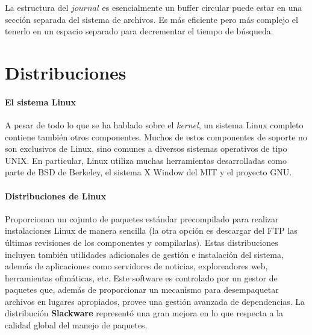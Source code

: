 \documentclass[spanish]{article}
\begin{document}
La estructura del $journal$ es esencialmente un buffer circular puede estar en una sección separada del sistema de archivos. Es más eficiente pero más complejo el tenerlo en un espacio separado para decrementar el tiempo de búsqueda.

\section{Distribuciones}
\paragraph{El sistema Linux} A pesar de todo lo que se ha hablado sobre el \textit{kernel}, un sistema Linux completo contiene también otros componentes. Muchos de estos componentes de soporte no son exclusivos de Linux, sino comunes a diversos sistemas operativos de tipo UNIX. En particular, Linux utiliza muchas herramientas desarrolladas como parte de BSD de Berkeley, el sistema X Window del MIT y el proyecto GNU. 


\paragraph{Distribuciones de Linux}Proporcionan un cojunto de paquetes estándar precompilado para realizar instalaciones Linux de manera sencilla (la otra opción es descargar del FTP las últimas revisiones de los componentes y compilarlas). Estas distribuciones incluyen también utilidades adicionales de gestión e instalación del sistema, además de aplicaciones como servidores de noticias, exploreadores web, herramientas ofimáticas, etc. Este software es controlado por un gestor de paquetes que, además de proporcionar un mecanismo para desempaquetar archivos en lugares apropiados, provee una gestión avanzada de dependencias. La distribución \textbf{Slackware} representó una gran mejora en lo que respecta a la calidad global del manejo de paquetes. 
\end{document}
